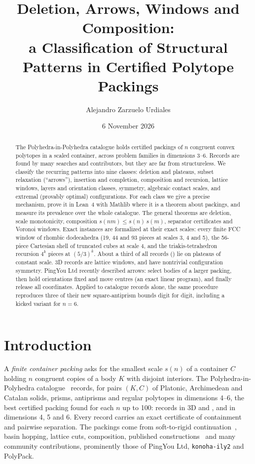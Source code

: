 \documentclass[11pt,a4paper]{article}
\title{Deletion, Arrows, Windows and Composition:\\a Classification of Structural Patterns in \nRecords{} Certified Polytope Packings}
\author{Alejandro Zarzuelo Urdiales}
\date{6 November 2026}
\newcommand{\code}[1]{\texttt{\nolinkurl{#1}}}
\theoremstyle{definition}
\theoremstyle{remark}
\begin{document}
\maketitle

\begin{abstract}
The Polyhedra-in-Polyhedra catalogue holds \nRecords{} certified packings of $n$ congruent convex polytopes in a scaled container, across \nFamilies{} problem families in dimensions 3--6. Records are found by many searches and contributors, but they are far from structureless. We classify the recurring patterns into nine classes: deletion and plateaus, subset relaxation (``arrows''), insertion and completion, composition and recursion, lattice windows, layers and orientation classes, symmetry, algebraic contact scales, and extremal (provably optimal) configurations. For each class we give a precise mechanism, prove it in Lean~4 with Mathlib where it is a theorem about packings, and measure its prevalence over the whole catalogue. The general theorems are deletion, scale monotonicity, composition $s(nm)\le s(n)\,s(m)$, separator certificates and Voronoi windows. Exact instances are formalized at their exact scales: every finite FCC window of rhombic dodecahedra (19, 44 and 93 pieces at scales 3, 4 and 5), the 56-piece Cartesian shell of truncated cubes at scale 4, and the triakis-tetrahedron recursion $4^k$ pieces at $(5/3)^k$. About a third of all records (\nPlateauRecords{}) lie on \nPlateaus{} plateaus of constant scale. \nLattice{} 3D records are lattice windows, and \nSymNontrivial{} have nontrivial configuration symmetry. PingYou Ltd recently described arrows: select bodies of a larger packing, then hold orientations fixed and move centres (an exact linear program), and finally release all coordinates. Applied to catalogue records alone, the same procedure reproduces three of their new square-antiprism bounds digit for digit, including a kicked variant for $n=6$.
\end{abstract}

\section{Introduction}

A \emph{finite container packing} asks for the smallest scale $s(n)$ of a container $C$ holding $n$ congruent copies of a body $K$ with disjoint interiors. The Polyhedra-in-Polyhedra catalogue~\cite{archive} records, for \nFamilies{} pairs $(K,C)$ of Platonic, Archimedean and Catalan solids, prisms, antiprisms and regular polytopes in dimensions 4--6, the best certified packing found for each $n$ up to 100: \nThreeD{} records in 3D and \nFourD{}, \nFiveD{} and \nSixD{} in dimensions 4, 5 and 6. Every record carries an exact certificate of containment and pairwise separation. The packings come from soft-to-rigid continuation~\cite{nakajima2026,zarzueloMethods}, basin hopping, lattice cuts, composition, published constructions~\cite{berthold2026} and many community contributions, prominently those of PingYou Ltd, \code{konoha-ily2} and PolyPack.
\end{document}
